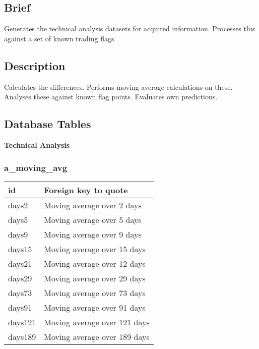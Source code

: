 \subsection{Brief}
Generates the technical analysis datasets for acquired information. \newline
Processes this against a set of known trading flags
\subsection{Description}
Calculates the differences. \newline
Performs moving average calculations on these. \newline
Analyses these against known flag points. \newline
Evaluates own predictions. \newline
\subsection{Database Tables}
\par \textbf{Technical Analysis}
\subsubsection{a\_moving\_avg}
\begin{tabular}{|l||l|}
	\hline
	id 				& Foreign key to quote \\ \hline
	days2			& Moving average over 2 days \\ \hline
	days5			& Moving average over 5 days \\ \hline
	days9			& Moving average over 9 days \\ \hline
	days15			& Moving average over 15 days \\ \hline
	days21			& Moving average over 12 days \\ \hline
	days29			& Moving average over 29 days \\ \hline
	days73			& Moving average over 73 days \\ \hline
	days91			& Moving average over 91 days \\ \hline
	days121			& Moving average over 121 days \\ \hline
	days189			& Moving average over 189 days \\ \hline
	\end{tabular}
